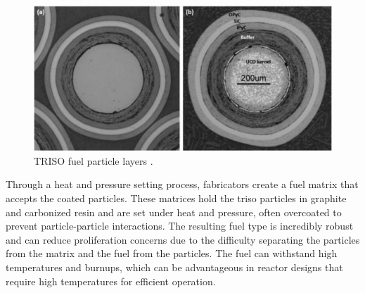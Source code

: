 \begin{figure}[H]
    \centering
    \includegraphics[scale=0.98]{images/triso_review/triso_layers.pdf}
    \caption{TRISO fuel particle layers \cite{particle_review_2019}.}
    \label{fig:triso_layers}
\end{figure}

Through a heat and pressure setting process, fabricators create a fuel matrix
that accepts the coated particles. These matrices hold the \gls{triso}
particles in graphite and carbonized resin and are set under heat and pressure,
often overcoated to prevent particle-particle interactions. The resulting fuel
type is incredibly robust and can reduce proliferation concerns due to the
difficulty separating the particles from the matrix and the fuel from the
particles. The fuel can withstand high temperatures and burnups, which can be
advantageous in reactor designs that require high temperatures for efficient
operation.
